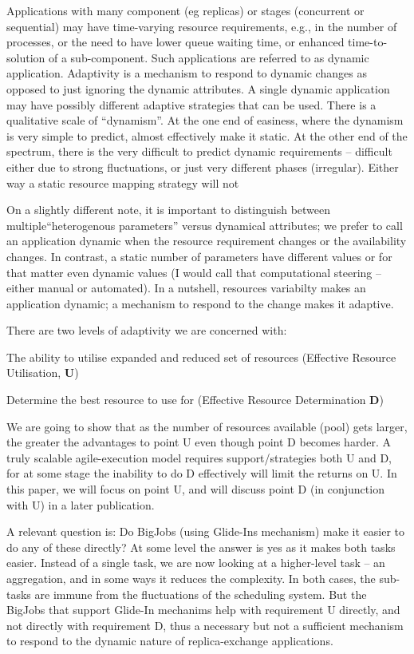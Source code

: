 \documentclass{rspublic}
\begin{document}
{Applications with many component (eg replicas) or stages (concurrent
or sequential) may have time-varying resource requirements, e.g., in
the number of processes, or the need to have lower queue waiting time,
or enhanced time-to-solution of a sub-component. Such applications are
referred to as dynamic application. Adaptivity is a mechanism to
respond to dynamic changes as opposed to just ignoring the dynamic
attributes. A single dynamic application may have possibly different
adaptive strategies that can be used. There is a qualitative scale of
``dynamism''. At the one end of easiness, where the dynamism is very
simple to predict, almost effectively make it static.  At the other
end of the spectrum, there is the very difficult to predict dynamic
requirements -- difficult either due to strong fluctuations, or just
very different phases (irregular). Either way a static resource
mapping strategy will not 

On a slightly different note, it is important to distinguish between
multiple``heterogenous parameters'' versus dynamical attributes; we
prefer to call an application dynamic when the resource requirement
changes or the availability changes. In contrast, a static number of
parameters have different values or for that matter even dynamic
values (I would call that computational steering -- either manual or
automated). In a nutshell, resources variabilty makes an application
dynamic; a mechanism to respond to the change makes it adaptive.

There are two levels of adaptivity we are concerned with:

\begin{compactitem}
\item  The ability to utilise expanded and reduced set of resources
    (Effective Resource Utilisation, {\bf U})
  \item Determine the best resource to use for (Effective Resource
    Determination {\bf D})
\end{compactitem}

We are going to show that as the number of resources available (pool)
gets larger, the greater the advantages to point U even though point D
becomes harder. A truly scalable agile-execution model requires
support/strategies both U and D, for at some stage the inability to do
D effectively will limit the returns on U. In this paper, we will
focus on point U, and will discuss point D (in conjunction with U) in
a later publication.

A relevant question is: Do BigJobs (using Glide-Ins mechanism) make it
easier to do any of these directly?  At some level the answer is yes
as it makes both tasks easier.  Instead of a single task, we are now
looking at a higher-level task -- an aggregation, and in some ways it
reduces the complexity.  In both cases, the sub-tasks are immune from
the fluctuations of the scheduling system.  But the BigJobs that
support Glide-In mechanims help with requirement U directly, and not
directly with requirement D, thus a necessary but not a sufficient
mechanism to respond to the dynamic nature of replica-exchange
applications.

}
\end{document}
